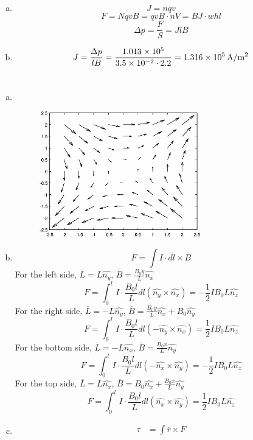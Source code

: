 \documentclass{article}
\begin{document}
\section{}
\begin{enumerate}[(a)]
\item
$$J=nqv$$
$$F=NqvB=qvB\cdot nV=BJ\cdot whl$$
$$\Delta p=\frac{F}{S}=JlB$$
\item
$$J=\frac{\Delta p}{lB}=\frac{1.013\times10^5}{3.5\times10^{-2}\cdot2.2}=1.316\times10^5\,\rm{A/m^2}$$
\end{enumerate}

\section{}
\begin{enumerate}[(a)]
\item \ 
\begin{figure}[h!]
    \centering
    \includegraphics[width=7cm]{5.eps}
    \label{fig-7}
\end{figure}
\item
$$F=\int I\cdot\overline{dl}\times\overline{B}$$
For the left side, $\overline{L}=L\hat{n_y}$, $\overline{B}=\frac{B_0y}{L}\hat{n_x}$
$$F=\int_0^l I\cdot\frac{B_0l}{L}dl(\hat{n_y}\times\hat{n_x})=-\frac{1}{2}IB_0L\hat{n_z}$$
For the right side, $\overline{L}=-L\hat{n_y}$, $\overline{B}=\frac{B_0y}{L}\hat{n_x}+B_0\hat{n_y}$
$$F=\int_0^l I\cdot\frac{B_0l}{L}dl(-\hat{n_y}\times\hat{n_x})=\frac{1}{2}IB_0L\hat{n_z}$$
For the bottom side, $\overline{L}=-L\hat{n_x}$, $\overline{B}=\frac{B_0x}{L}\hat{n_y}$
$$F=\int_0^l I\cdot\frac{B_0l}{L}dl(-\hat{n_x}\times\hat{n_y})=-\frac{1}{2}IB_0L\hat{n_z}$$
For the top side, $\overline{L}=L\hat{n_x}$, $\overline{B}=B_0\hat{n_x}+\frac{B_0x}{L}\hat{n_y}$
$$F=\int_0^l I\cdot\frac{B_0l}{L}dl(\hat{n_x}\times\hat{n_y})=\frac{1}{2}IB_0L\hat{n_z}$$
\item
\begin{align*}
\tau&=\int \overline{r}\times\overline{F}\\

\end{align*}
\end{enumerate}
\end{document}
